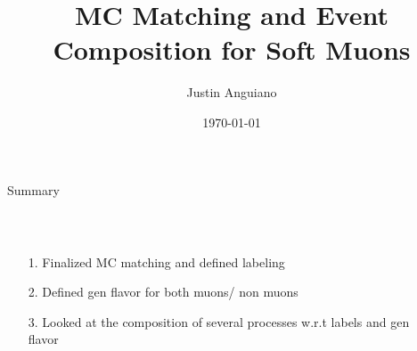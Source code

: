 \documentclass[10pt,handout]{beamer}
\author{Justin Anguiano}
\title{MC Matching and Event Composition for Soft Muons}
\institute{University of Kansas}
\date{\today}
\begin{document}
\begin{frame}
\titlepage
\end{frame}



\begin{frame}{Summary}

\begin{columns}
\begin{column}{0.5\textwidth}
 \\
\begin{itemize}
\item[1.] Finalized MC matching and defined labeling
\item[2.] Defined gen flavor for both muons/ non muons
\item[3.] Looked at the composition of several processes w.r.t labels and gen flavor
\end{itemize}

\end{column}
\begin{column}{0.5\textwidth}
\end{column}
\end{columns}
\end{frame}
\end{document}
